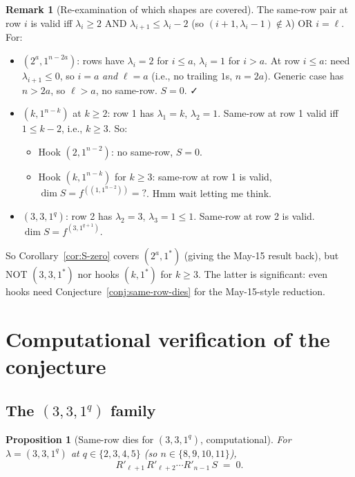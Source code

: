 \documentclass[11pt]{article}
\newtheorem{proposition}[theorem]{Proposition}
\theoremstyle{definition}
\newtheorem{remark}[theorem]{Remark}
\begin{document}
\begin{remark}[Re-examination of which shapes are covered]\label{rem:re-examine}
The same-row pair at row $i$ is valid iff $\lambda_i \ge 2$ AND
$\lambda_{i+1} \le \lambda_i - 2$ (so $(i+1, \lambda_i - 1) \notin \lambda$)
OR $i = \ell$. For:
\begin{itemize}[leftmargin=2em,topsep=0.2em,itemsep=0.1em]
\item $(2^a, 1^{n-2a})$: rows have $\lambda_i = 2$ for $i \le a$,
$\lambda_i = 1$ for $i > a$. At row $i \le a$: need $\lambda_{i+1} \le 0$,
so $i = a$ \emph{and} $\ell = a$ (i.e., no trailing $1$s, $n = 2a$).
Generic case has $n > 2a$, so $\ell > a$, no same-row. $S = 0$. ✓
\item $(k, 1^{n-k})$ at $k \ge 2$: row 1 has $\lambda_1 = k$, $\lambda_2 = 1$.
Same-row at row 1 valid iff $1 \le k - 2$, i.e., $k \ge 3$. So:
\begin{itemize}[leftmargin=2em]
\item Hook $(2, 1^{n-2})$: no same-row, $S = 0$.
\item Hook $(k, 1^{n-k})$ for $k \ge 3$: same-row at row 1 is valid,
$\dim S = f^{((1, 1^{n-2}))} = ?$. Hmm wait letting me think.
\end{itemize}
\item $(3, 3, 1^q)$: row 2 has $\lambda_2 = 3$, $\lambda_3 = 1 \le 1$.
Same-row at row 2 is valid. $\dim S = f^{(3, 1^{q+1})}$.
\end{itemize}
So Corollary~\ref{cor:S-zero} covers $(2^a, 1^*)$ (giving the
May-15 result back), but NOT $(3, 3, 1^*)$ nor hooks $(k, 1^*)$ for
$k \ge 3$. The latter is significant: even hooks need
Conjecture~\ref{conj:same-row-dies} for the May-15-style reduction.
\end{remark}

\section{Computational verification of the conjecture}\label{sec:comp-verify}

\subsection{The $(3, 3, 1^q)$ family}

\begin{proposition}[Same-row dies for $(3, 3, 1^q)$, computational]\label{prop:same-row-comp}
For $\lambda = (3, 3, 1^q)$ at $q \in \{2, 3, 4, 5\}$
(so $n \in \{8, 9, 10, 11\}$),
\[
   R'_{\ell+1}\,R'_{\ell+2}\cdots R'_{n-1}\,S \;=\; 0.
\]
\end{proposition}
\end{document}
